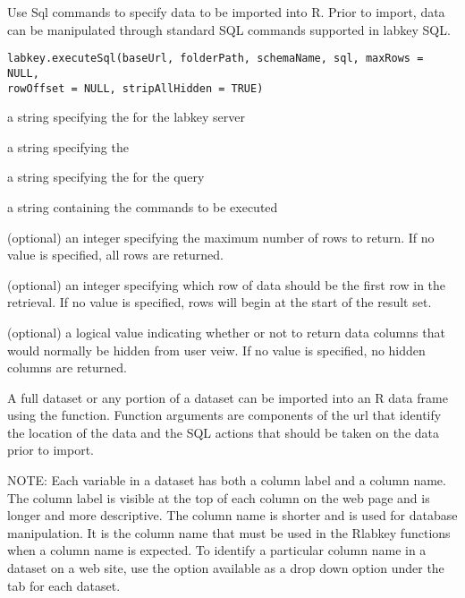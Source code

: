 \documentclass{book}
\begin{document}
\begin{Description}\relax
Use Sql commands to specify data to be imported into R. Prior to import, data can
be manipulated through standard SQL commands supported in labkey SQL.
\end{Description}
\begin{Usage}
\begin{verbatim}
labkey.executeSql(baseUrl, folderPath, schemaName, sql, maxRows = NULL, 
rowOffset = NULL, stripAllHidden = TRUE)
\end{verbatim}
\end{Usage}
\begin{Arguments}
\begin{ldescription}
\item[\code{baseUrl}] a string specifying the for the labkey server
\item[\code{folderPath}] a string specifying the  
\item[\code{schemaName}] a string specifying the   for the query
\item[\code{sql}] a string containing the  commands to be executed
\item[\code{maxRows}] (optional) an integer specifying the maximum number of rows to return. If no value is specified, all rows are returned.
\item[\code{rowOffset}] (optional) an integer specifying which row of data should be the first row in the retrieval. 
If no value is specified, rows will begin at the start of the result set.
\item[\code{stripAllHidden}] (optional) a logical value indicating whether or not to return data columns that would 
normally be hidden from user veiw. If no value is specified, no hidden columns are returned.
\end{ldescription}
\end{Arguments}
\begin{Details}\relax
A full dataset or any portion of a dataset can be imported into an R
data frame using the 
function. Function arguments are components of the url that identify the location of the
data and the SQL actions that should be taken on the data prior to import.


NOTE: Each variable in a dataset has both a column label and a column name. The column label is visible at the top
of each column on the web page and is longer and more descriptive. The column name is shorter and is
used  for database manipulation. It is the column name that must be used in
the Rlabkey functions when a column name is expected. To identify a particular column name in a dataset on
a web site, use the  option available as a drop down option under the 
tab for each dataset.
\end{Details}
\end{document}
